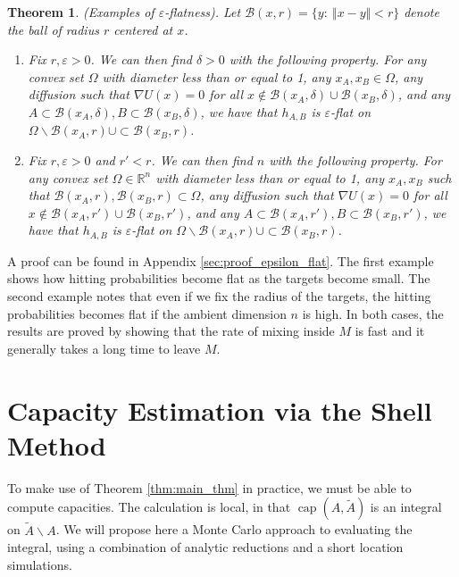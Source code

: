 \documentclass[12pt, nofootinbib,english, amsmath, amssymb, aps, priprint, graphicx,floatfix]{revtex4-1}
\newtheorem{theorem}{Theorem}
\theoremstyle{plain}
\theoremstyle{definition}
\theoremstyle{plain}
\newcommand{\capac}[2]{\ensuremath{\operatorname{cap}}(#1,#2)}
\newcommand{\bb}[1]{\mathcal{B}\left(#1\right)}
\newcommand{\tA}{{\tilde A}}
\begin{document}
\begin{theorem}\label{thm:epsilon_flat} (Examples of $\varepsilon$-flatness).   Let $\bb{x,r} = \{y:\ \Vert x-y \Vert < r\}$ denote the ball of radius $r$ centered at $x$.
\begin{enumerate}
    \item Fix $r,\varepsilon>0$.  We can then find $\delta>0$ with the following property.  For any convex set $\Omega$ with diameter less than or equal to 1, any $x_A,x_B \in \Omega$, any diffusion such that $\nabla U(x) =0$ for all $x\notin \bb{x_A, \delta} \cup \bb{x_B, \delta}$, and any $A\subset \bb{x_A, \delta}, B \subset \bb{x_B, \delta}$, we have that $h_{A,B}$ is $\varepsilon$-flat on $\Omega \backslash \bb{x_A, r} \cup \subset \bb{x_B, r}$.

    \item Fix $r,\varepsilon>0$ and $r'<r$.  We can then find $n$ with the following property.  For any convex set $\Omega \in \mathbb{R}^n$ with diameter less than or equal to 1, any $x_A,x_B$ such that $\bb{x_A, r},\bb{x_B, r} \subset \Omega$, any diffusion such that $\nabla U(x) =0$ for all $x\notin \bb{x_A, r'} \cup \bb{x_B, r'}$, and any $A\subset \bb{x_A, r'}, B \subset \bb{x_B, r'}$, we have that $h_{A,B}$ is $\varepsilon$-flat on $\Omega \backslash \bb{x_A, r} \cup \subset \bb{x_B, r}$.
\end{enumerate}
\end{theorem}

A proof can be found in Appendix \ref{sec:proof_epsilon_flat}.  The first example shows how hitting probabilities become flat as the targets become small.  The second example notes that even if we fix the radius of the targets, the hitting probabilities becomes flat if the ambient dimension $n$ is high.  In both cases, the results are proved by showing that the rate of mixing inside $M$ is fast and it generally takes a long time to leave $M$.

                                                         


\section{Capacity Estimation via the Shell Method}
\label{sec:Estimation}
To make use of Theorem \ref{thm:main_thm} in practice, we must be able to compute capacities.  The calculation is local, in that $\capac{A}{\tilde{A}}$ is an integral on $\tA\backslash A$. We will propose here a Monte Carlo approach to evaluating the integral, using a combination of analytic reductions and a short location simulations.
\end{document}
